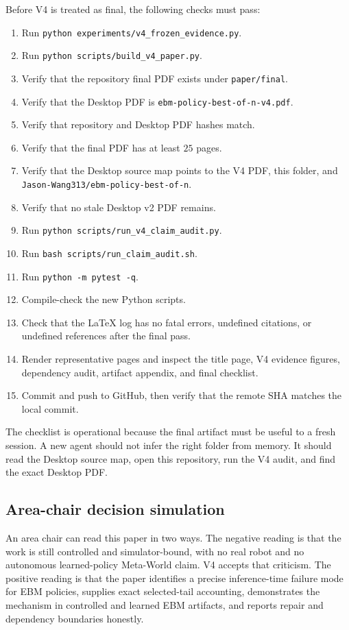 Before V4 is treated as final, the following checks must pass:
\begin{enumerate}
\item Run \texttt{python experiments/v4\_frozen\_evidence.py}.
\item Run \texttt{python scripts/build\_v4\_paper.py}.
\item Verify that the repository final PDF exists under \texttt{paper/final}.
\item Verify that the Desktop PDF is
\texttt{ebm-policy-best-of-n-v4.pdf}.
\item Verify that repository and Desktop PDF hashes match.
\item Verify that the final PDF has at least \(25\) pages.
\item Verify that the Desktop source map points to the V4 PDF, this folder,
and \texttt{Jason-Wang313/ebm-policy-best-of-n}.
\item Verify that no stale Desktop v2 PDF remains.
\item Run \texttt{python scripts/run\_v4\_claim\_audit.py}.
\item Run \texttt{bash scripts/run\_claim\_audit.sh}.
\item Run \texttt{python -m pytest -q}.
\item Compile-check the new Python scripts.
\item Check that the LaTeX log has no fatal errors, undefined citations, or
undefined references after the final pass.
\item Render representative pages and inspect the title page, V4 evidence
figures, dependency audit, artifact appendix, and final checklist.
\item Commit and push to GitHub, then verify that the remote SHA matches the
local commit.
\end{enumerate}

The checklist is operational because the final artifact must be useful to a
fresh session. A new agent should not infer the right folder from memory. It
should read the Desktop source map, open this repository, run the V4 audit,
and find the exact Desktop PDF.

\subsection{Area-chair decision simulation}
\label{app:V4-ac-simulation}

An area chair can read this paper in two ways. The negative reading is that
the work is still controlled and simulator-bound, with no real robot and no
autonomous learned-policy Meta-World claim. V4 accepts that criticism. The
positive reading is that the paper identifies a precise inference-time failure
mode for EBM policies, supplies exact selected-tail accounting, demonstrates
the mechanism in controlled and learned EBM artifacts, and reports repair and
dependency boundaries honestly.

